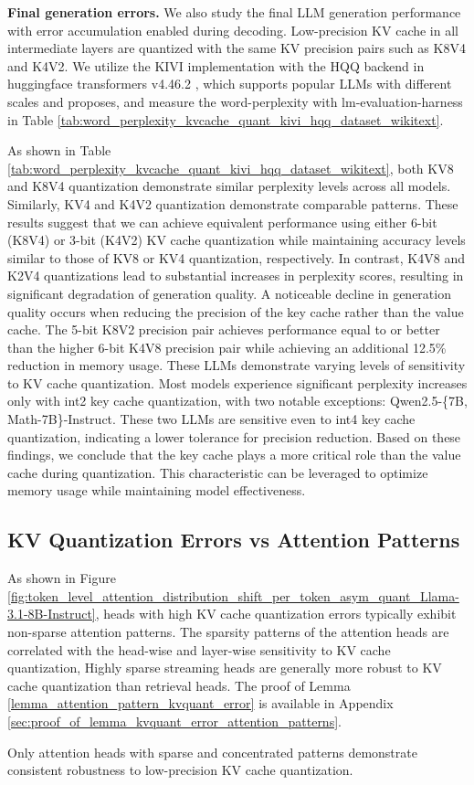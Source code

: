 \textbf{Final generation errors.} 
We also study the final LLM generation performance with error accumulation enabled during decoding. Low-precision KV cache in all intermediate layers are quantized with the same KV precision pairs such as K8V4 and K4V2.
We utilize the KIVI implementation with the HQQ backend in huggingface transformers v4.46.2 \cite{wolf2020transformers}, which supports popular LLMs with different scales and proposes, and measure the word-perplexity with lm-evaluation-harness \cite{eval-harness} in Table \ref{tab:word_perplexity_kvcache_quant_kivi_hqq_dataset_wikitext}. 

As shown in Table \ref{tab:word_perplexity_kvcache_quant_kivi_hqq_dataset_wikitext}, both KV8 and K8V4 quantization demonstrate similar perplexity levels across all models. Similarly, KV4 and K4V2 quantization demonstrate comparable patterns. These results suggest that we can achieve equivalent performance using either 6-bit (K8V4) or 3-bit (K4V2) KV cache quantization while maintaining accuracy levels similar to those of KV8 or KV4 quantization, respectively. In contrast, K4V8 and K2V4 quantizations lead to substantial increases in perplexity scores, resulting in significant degradation of generation quality. 
A noticeable decline in generation quality occurs when reducing the precision of the key cache rather than the value cache. The 5-bit K8V2 precision pair achieves performance equal to or better than the higher 6-bit K4V8 precision pair while achieving an additional 12.5\% reduction in memory usage.
These LLMs demonstrate varying levels of sensitivity to KV cache quantization. Most models experience significant perplexity increases only with int2 key cache quantization, with two notable exceptions: Qwen2.5-\{7B, Math-7B\}-Instruct. These two LLMs are sensitive even to int4 key cache quantization, indicating a lower tolerance for precision reduction.
Based on these findings, we conclude that the key cache plays a more critical role than the value cache during quantization. This characteristic can be leveraged to optimize memory usage while maintaining model effectiveness.


\subsection{KV Quantization Errors vs Attention Patterns}
\label{sec:attention_patterns_layer_sensitivity}
As shown in Figure  \ref{fig:token_level_attention_distribution_shift_per_token_asym_quant_Llama-3.1-8B-Instruct}, heads with high KV cache quantization errors typically exhibit non-sparse attention patterns. The sparsity patterns of the attention heads are correlated with the head-wise and layer-wise sensitivity to KV cache quantization,  Highly sparse streaming heads are generally more robust to KV cache quantization than retrieval heads. The proof of Lemma \ref{lemma_attention_pattern_kvquant_error} is available in Appendix \ref{sec:proof_of_lemma_kvquant_error_attention_patterns}.
\begin{lemma}
Only attention heads with sparse and concentrated patterns demonstrate consistent robustness to low-precision KV cache quantization.
\label{lemma_attention_pattern_kvquant_error}
\end{lemma}


